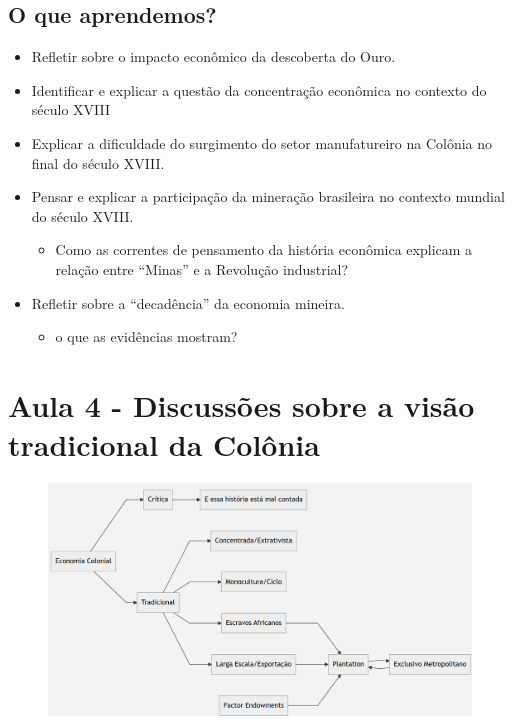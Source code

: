 \documentclass[a4paper,12pt]{article}[abntex2]
\begin{document}
\subsection{\textbf{O que aprendemos?}}
\begin{itemize}
    \item Refletir sobre o impacto econômico da descoberta do Ouro.
    \item Identificar e explicar a questão da concentração econômica no contexto do século XVIII
    \item Explicar a dificuldade do surgimento do setor manufatureiro na Colônia no final do século XVIII.
    \item  Pensar e explicar a participação da mineração brasileira no contexto mundial do século XVIII. \begin{itemize}
        \item Como as correntes de pensamento da história econômica explicam a relação entre “Minas” e a Revolução industrial?
    \end{itemize}
    \item Refletir sobre a “decadência” da economia mineira. \begin{itemize}
        \item o que as evidências mostram?
    \end{itemize}
\end{itemize}
\newpage



\section{\textbf{Aula 4 - Discussões sobre a visão tradicional da Colônia}}
\begin{figure}[H]
    \centering
    \includegraphics[width=1.0\textwidth]{Imagens Slides/i1a4.png}
\end{figure}
\end{document}
